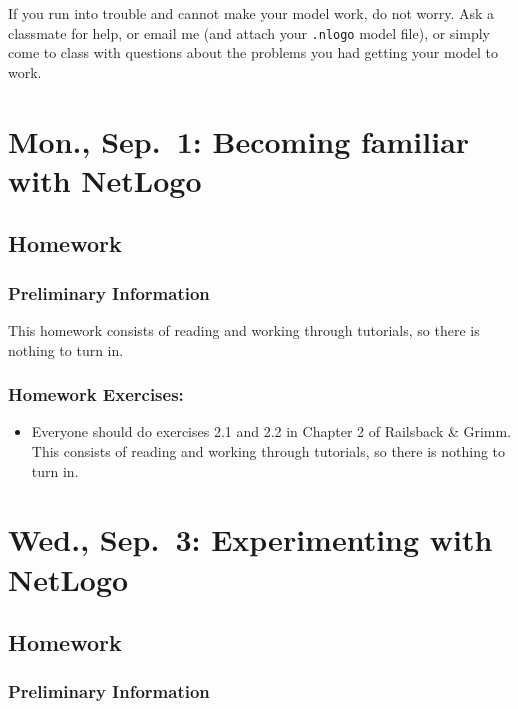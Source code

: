 \documentclass[
]{article}
\providecommand{\tightlist}{%
  \setlength{\itemsep}{0pt}\setlength{\parskip}{0pt}}
\begin{document}
If you run into trouble and cannot make your model work, do not worry.
Ask a classmate for help, or email me (and attach your \texttt{.nlogo}
model file), or simply come to class with questions about the problems
you had getting your model to work.

\section{Mon., Sep.~1: Becoming familiar with
NetLogo}\label{mon.-sep.-1-becoming-familiar-with-netlogo}

\subsection{Homework}\label{homework-2}

\subsubsection{Preliminary Information}\label{preliminary-information-1}

This homework consists of reading and working through tutorials, so
there is nothing to turn in.

\subsubsection{Homework Exercises:}\label{homework-exercises-2}

\begin{itemize}
\tightlist
\item
  Everyone should do exercises 2.1 and 2.2 in Chapter 2 of Railsback \&
  Grimm. This consists of reading and working through tutorials, so
  there is nothing to turn in.
\end{itemize}

\section{Wed., Sep.~3: Experimenting with
NetLogo}\label{wed.-sep.-3-experimenting-with-netlogo}

\subsection{Homework}\label{homework-3}

\subsubsection{Preliminary Information}\label{preliminary-information-2}
\end{document}
